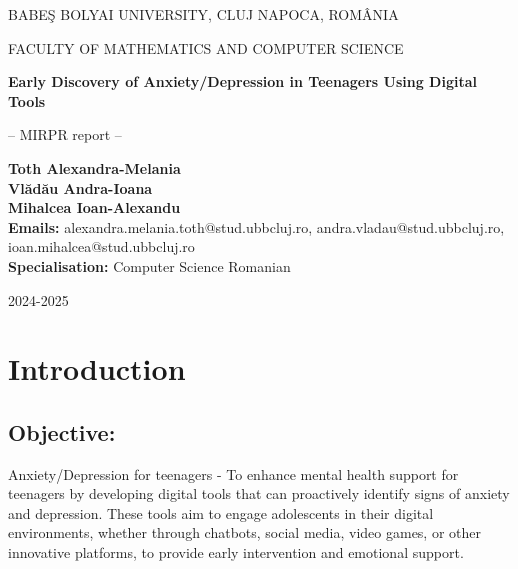 \documentclass[runningheads,a4paper,11pt]{report}
\begin{document}
\begin{titlepage}
\sloppy

\begin{center}
BABE\c S BOLYAI UNIVERSITY, CLUJ NAPOCA, ROM\^ ANIA

FACULTY OF MATHEMATICS AND COMPUTER SCIENCE

\vspace{5cm}

\Huge \textbf{Early Discovery of Anxiety/Depression in Teenagers Using Digital Tools}

\vspace{1cm}

\normalsize -- MIRPR report --

\end{center}


\vspace{5cm}

\begin{flushright}
\Large{\textbf{Toth Alexandra-Melania \\ Vl\u{a}d\u{a}u Andra-Ioana \\ Mihalcea Ioan-Alexandu}}\\
\textbf {Emails: }
alexandra.melania.toth@stud.ubbcluj.ro, 
andra.vladau@stud.ubbcluj.ro, 
ioan.mihalcea@stud.ubbcluj.ro\\
\textbf{ Specialisation:} Computer Science Romanian
\end{flushright}

\vspace{2cm}


\begin{center}
2024-2025
\end{center}

\end{titlepage}


\tableofcontents

\newpage

\listoffigures

\newpage



\newpage



\chapter{Introduction}
\label{chapter:introduction}


\section{Objective:}
\label{section:objective}
Anxiety/Depression for teenagers - To enhance mental health support for teenagers by developing digital tools that can proactively identify signs of anxiety and depression. These tools aim to engage adolescents in their digital environments, whether through chatbots, social media, video games, or other innovative platforms, to provide early intervention and emotional support.
\end{document}
